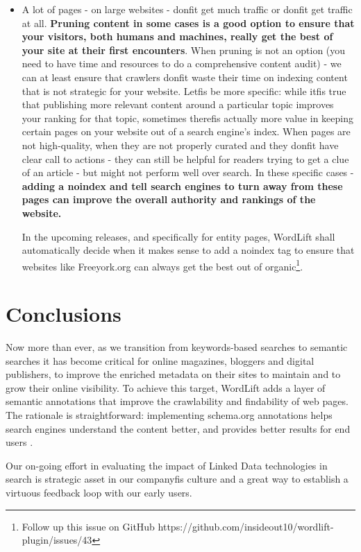 \documentclass[runningheads,a4paper]{llncs}
\begin{document}
\begin{itemize}
\item A lot of pages - on large websites - donfit get much traffic or
 donfit get traffic at all. {\bf Pruning content in some cases is a good option to ensure that your visitors, both humans and machines, really get the best of your site at their first encounters}. When pruning is not an option
 (you need to have time and resources to do a comprehensive content audit) - we can at least ensure that crawlers
 donfit waste their time on indexing content that is not
 strategic for your website. Letfis be more specific: while
 itfis true that publishing more relevant content around a
 particular topic improves your ranking for that topic, sometimes therefis actually more value in keeping certain pages
 on your website out of a search engine's index. When
 pages are not high-quality, when they are not properly
 curated and they donfit have clear call to actions - they can
 still be helpful for readers trying to get a clue of an article
- but might not perform well over search. In these specific
 cases -{\bf  adding a noindex and tell search engines to turn away from these pages can improve the overall authority and rankings of the website.}

In the upcoming releases, and specifically for entity pages, WordLift
 shall automatically decide when it makes sense to add a noindex
 tag to ensure that websites like Freeyork.org can always get the
 best out of organic\footnote{Follow
 up this issue on GitHub https://github.com/insideout10/wordlift-
plugin/issues/43}.
\end{itemize}

\section{Conclusions}

Now more than ever, as we transition from keywords-based searches
 to semantic searches it has become critical for online magazines,
 bloggers and digital publishers, to improve the enriched metadata
 on their sites to maintain and to grow their online visibility. To
 achieve this target, WordLift adds a layer of semantic annotations
 that improve the crawlability and findability of web pages. The
 rationale is straightforward: implementing schema.org annotations
 helps search engines understand the content better, and provides
 better results for end users  \cite{__RefHeading__454_683783752}.

Our on-going effort in evaluating the impact of Linked Data
 technologies in search is strategic asset in our companyfis culture
 and a great way to establish a virtuous feedback loop with our early
 users.
\end{document}
